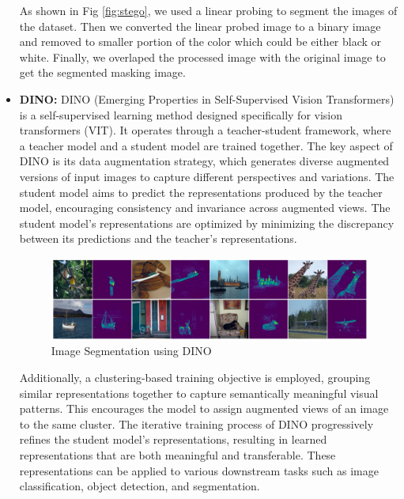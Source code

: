 \begin{itemize}
    As shown in Fig \ref{fig:stego}, we used a linear probing to segment the images of the dataset. Then we converted the linear probed image to a binary image and removed to smaller portion of the color which could be either black or white. Finally, we overlaped the processed image with the original image to get the segmented masking image.
    
    \item \textbf{DINO:}
    DINO (Emerging Properties in Self-Supervised Vision Transformers) is a self-supervised learning method designed specifically for vision transformers (VIT). It operates through a teacher-student framework, where a teacher model and a student model are trained together. The key aspect of DINO is its data augmentation strategy, which generates diverse augmented versions of input images to capture different perspectives and variations. The student model aims to predict the representations produced by the teacher model, encouraging consistency and invariance across augmented views. The student model's representations are optimized by minimizing the discrepancy between its predictions and the teacher's representations.
    \begin{figure}
        \centering
        \includegraphics[scale=.25]{figures/dino.png}
        \caption{Image Segmentation using DINO \cite{caron2021emerging}}
        \label{fig:my_label}
    \end{figure}
    Additionally, a clustering-based training objective is employed, grouping similar representations together to capture semantically meaningful visual patterns. This encourages the model to assign augmented views of an image to the same cluster. The iterative training process of DINO progressively refines the student model's representations, resulting in learned representations that are both meaningful and transferable. These representations can be applied to various downstream tasks such as image classification, object detection, and segmentation.
    \begin{figure}
        \centering

\end{figure}
\end{itemize}
